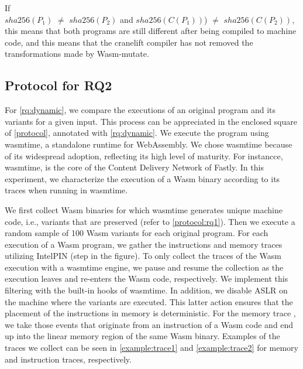 \documentclass[sigplan,screen]{acmart}
\newcommand*\badge[1]{ \colorbox{red}{\color{white}#1}}
\newcommand{\tool}{Wasm-mutate\xspace}
\newcommand{\wasm}{Wasm\xspace}
\newcommand{\Wasm}{WebAssembly\xspace}
\newcommand*\step[1]{
\noindent\tikz[baseline=(char.base)]{
        \node[shape=circle,text=black,draw=black, fill=white,inner sep=1.2pt] (char) {#1};}}
\newcommand{\todo}[1]{%
\refstepcounter{todo}
\noindent\textbf{\badge{TODO}} {\color{red}#1}
\addcontentsline{td}{todo}
{\color{red}\thesection.\thetodo\xspace #1}}
\begin{document}
If \\ $sha256(P_1)$ $\neq$ $sha256(P_2)$ and $sha256(C(P_1))$) $\neq$ $sha256(C(P_2))$, this means that  both programs are still different after being compiled to machine code, and this means that the cranelift compiler has not removed the transformations made by \tool.  



\subsection{Protocol for RQ2}
\newcommand{\samples}{100\xspace}

For \ref{rq:dynamic}, we compare  the executions of an original program and its variants for a given input.
This process can be appreciated in the enclosed square of \autoref{protocol}, annotated with \ref{rq:dynamic}.
We execute the program using wasmtime, a standalone runtime for \Wasm. 
We chose wasmtime because of its widespread adoption, reflecting its high level of maturity.
For instancce, wasmtime, is the core of the Content Delivery Network of Fastly.
In this experiment, we characterize the  execution of a \wasm binary according to its traces when running in wasmtime.

We first collect \wasm binaries for which wasmtime generates unique machine code, i.e., variants that are preserved (refer to \autoref{protocol:rq1}).
Then we execute a random sample of \samples \wasm variants for each original program.
For each execution of a \wasm program, we gather the instructions and memory traces utilizing IntelPIN \cite{luk2005pin, 10.1145/3478520} (step \step{4} in the figure).
To only collect the traces of the Wasm execution with a wasmtime engine, we pause and resume the collection as the execution leaves and re-enters the Wasm code, respectively.
We implement this filtering with the built-in hooks of wasmtime.
In addition, we disable ASLR on the machine where the variants are executed.
This latter action ensures that the placement of the instructions in memory is deterministic.
For the memory trace , we take those events that originate from an instruction of a Wasm code and end up into the linear memory region of the same Wasm binary.
Examples of the traces we collect can be seen in \autoref{example:trace1} and \autoref{example:trace2} for memory and instruction traces, respectively.


\end{document}
